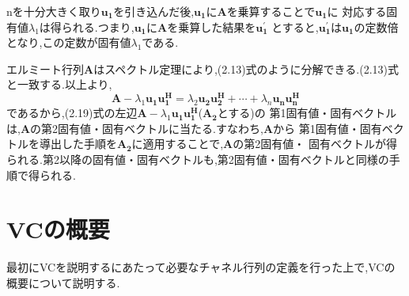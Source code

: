 nを十分大きく取り$\bm{u_1}$を引き込んだ後,$\bm{u_1}$に$\bm{A}$を乗算することで$\bm{u_1}$に
対応する固有値$\lambda_1$は得られる.つまり,$\bm{u_1}$に$\bm{A}$を乗算した結果を$\bm{u_1^{\prime}}$
とすると,$\bm{u_1^{\prime}}$は$\bm{u_1}$の定数倍となり,この定数が固有値$\lambda_1$である.

エルミート行列$\bm{A}$はスペクトル定理により,(2.13)式のように分解できる.(2.13)式と一致する.以上より,
\begin{equation}
    \bm{A} - \lambda_1\bm{u_1}\bm{u_1^H} = \lambda_2\bm{u_2}\bm{u_2^H} + \cdots + \lambda_n\bm{u_n}\bm{u_n^H}
\end{equation}
であるから,(2.19)式の左辺$\bm{A} - \lambda_1\bm{u_1}\bm{u_1^H}$($\bm{A_2}$とする)の
第1固有値・固有ベクトルは,$\bm{A}$の第2固有値・固有ベクトルに当たる.すなわち,$\bm{A}$から
第1固有値・固有ベクトルを導出した手順を$\bm{A_2}$に適用することで,$\bm{A}$の第2固有値・
固有ベクトルが得られる.第2以降の固有値・固有ベクトルも,第2固有値・固有ベクトルと同様の手順で得られる.

\section{VCの概要}
最初にVCを説明するにあたって必要なチャネル行列の定義を行った上で,VCの概要について説明する.


